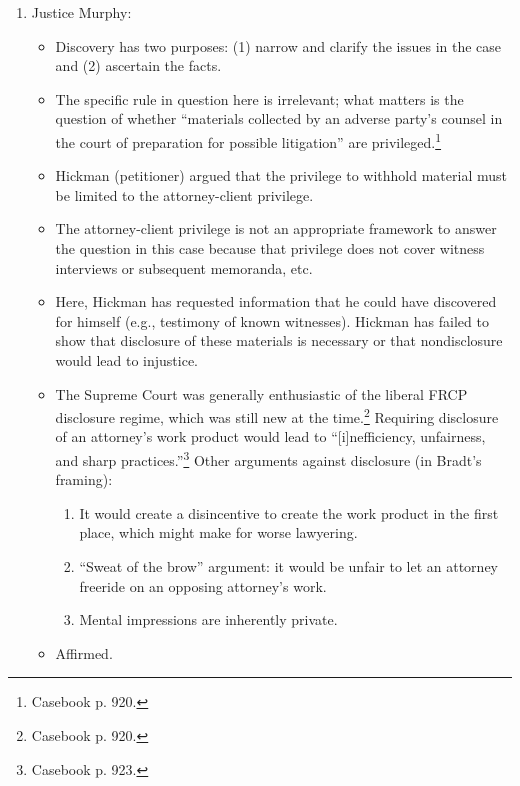 \begin{enumerate}
    was privileged because it was part of the \textbf{``work product of the 
    lawyer.''}\footnote{Casebook p. 919.}
    \item Justice Murphy:
    \begin{itemize}
        \item Discovery has two purposes: (1) narrow and clarify the issues in 
        the case and (2) ascertain the facts.
        \item The specific rule in question here is irrelevant; what matters 
        is the question of whether ``materials collected by an adverse party's 
        counsel in the court of preparation for possible litigation'' are 
        privileged.\footnote{Casebook p. 920.}
        \item Hickman (petitioner) argued that the privilege to withhold 
        material must be limited to the attorney-client privilege.
        \item The attorney-client privilege is not an appropriate framework to 
        answer the question in this case because that privilege does not cover 
        witness interviews or subsequent memoranda, etc.
        \item Here, Hickman has requested information that he could have 
        discovered for himself (e.g., testimony of known witnesses). Hickman 
        has failed to show that disclosure of these materials is necessary or 
        that nondisclosure would lead to injustice.
        \item The Supreme Court was generally enthusiastic of the liberal FRCP 
        disclosure regime, which was still new at the time.\footnote{Casebook 
        p. 920.} Requiring disclosure of an attorney's work product would lead 
        to ``[i]nefficiency, unfairness, and sharp 
        practices.''\footnote{Casebook p. 923.} Other arguments against 
        disclosure (in Bradt's framing):
        \begin{enumerate}
            \item It would create a disincentive to create the work product in 
            the first place, which might make for worse lawyering.
            \item ``Sweat of the brow'' argument: it would be unfair to let an 
            attorney freeride on an opposing attorney's work.
            \item Mental impressions are inherently private.
        \end{enumerate}
        \item Affirmed.

\end{itemize}
\end{enumerate}
